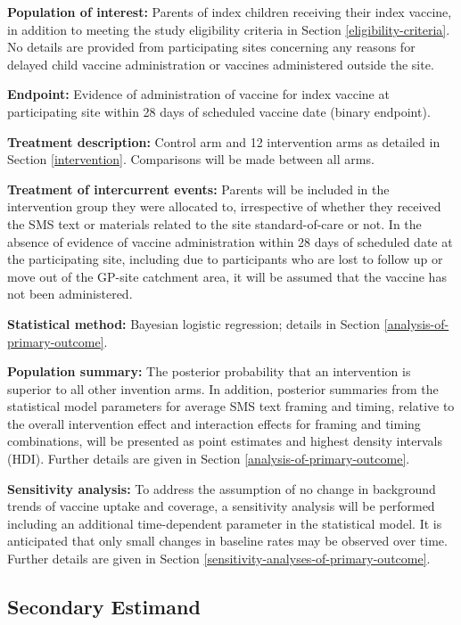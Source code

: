 \documentclass[
  bibliography=totoc]{scrreprt}
\begin{document}
\textbf{Population of interest:} Parents of index children receiving their index vaccine, in addition to meeting the study eligibility criteria in Section \ref{eligibility-criteria}.
No details are provided from participating sites concerning any reasons for delayed child vaccine administration or vaccines administered outside the site.

\textbf{Endpoint:} Evidence of administration of vaccine for index vaccine at participating site within 28 days of scheduled vaccine date (binary endpoint).

\textbf{Treatment description:} Control arm and 12 intervention arms as detailed in Section \ref{intervention}.
Comparisons will be made between all arms.

\textbf{Treatment of intercurrent events:} Parents will be included in the intervention group they were allocated to, irrespective of whether they received the SMS text or materials related to the site standard-of-care or not.
In the absence of evidence of vaccine administration within 28 days of scheduled date at the participating site, including due to participants who are lost to follow up or move out of the GP-site catchment area, it will be assumed that the vaccine has not been administered.

\textbf{Statistical method:} Bayesian logistic regression; details in Section \ref{analysis-of-primary-outcome}.

\textbf{Population summary:} The posterior probability that an intervention is superior to all other invention arms.
In addition, posterior summaries from the statistical model parameters for average SMS text framing and timing, relative to the overall intervention effect and interaction effects for framing and timing combinations, will be presented as point estimates and highest density intervals (HDI).
Further details are given in Section \ref{analysis-of-primary-outcome}.

\textbf{Sensitivity analysis:} To address the assumption of no change in background trends of vaccine uptake and coverage, a sensitivity analysis will be performed including an additional time-dependent parameter in the statistical model.
It is anticipated that only small changes in baseline rates may be observed over time.
Further details are given in Section \ref{sensitivity-analyses-of-primary-outcome}.

\hypertarget{secondary-estimand}{%
\subsection{Secondary Estimand}\label{secondary-estimand}}
\end{document}

